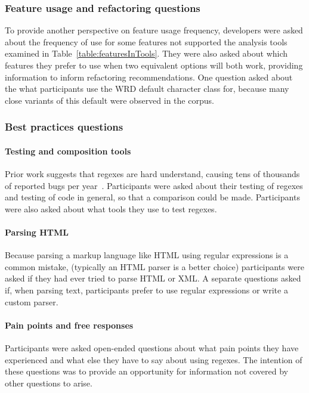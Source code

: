 \subsubsection{Feature usage and refactoring questions}
To provide another perspective on feature usage frequency, developers were asked about the frequency of use for some features not supported the analysis tools examined in Table~\ref{table:featuresInTools}.  They were also asked about which features they prefer to use when two equivalent options will both work, providing information to inform refactoring recommendations.  One question asked about the what participants use the WRD default character class for, because many close variants of this default were observed in the corpus.

\subsubsection{Best practices questions}
\paragraph{Testing and composition tools} Prior work suggests that regexes are hard understand, causing tens of thousands of reported bugs per year~.   Participants were asked about their testing of regexes and testing of code in general, so that a comparison could be made.  Participants were also asked about what tools they use to test regexes.

\paragraph{Parsing HTML} Because parsing a markup language like HTML using regular expressions is a common mistake, (typically an HTML parser is a better choice) participants were asked if they had ever tried to parse HTML or XML.  A separate questions asked if, when parsing text, participants prefer to use regular expressions or write a custom parser.

\paragraph{Pain points and free responses} Participants were asked open-ended questions about what pain points they have experienced and what else they have to say about using regexes.  The intention of these questions was to provide an opportunity for information not covered by other questions to arise.

